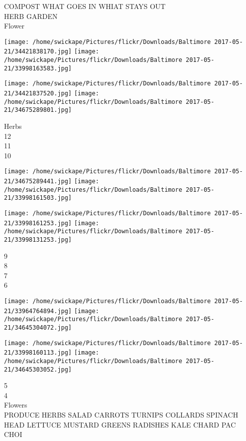 \documentclass[10pt,letterpaper]{article}
\begin{document}
COMPOST WHAT GOES IN WHIAT STAYS OUT\\
HERB GARDEN\\
Flower\\
\pagebreak

\texttt{[image: /home/swickape/Pictures/flickr/Downloads/Baltimore 2017-05-21/34421838170.jpg]}
\texttt{[image: /home/swickape/Pictures/flickr/Downloads/Baltimore 2017-05-21/33998163583.jpg]}

\texttt{[image: /home/swickape/Pictures/flickr/Downloads/Baltimore 2017-05-21/34421837520.jpg]}
\texttt{[image: /home/swickape/Pictures/flickr/Downloads/Baltimore 2017-05-21/34675289801.jpg]}

Herbs\\
12\\
11\\
10\\
\pagebreak

\texttt{[image: /home/swickape/Pictures/flickr/Downloads/Baltimore 2017-05-21/34675289441.jpg]}
\texttt{[image: /home/swickape/Pictures/flickr/Downloads/Baltimore 2017-05-21/33998161503.jpg]}

\texttt{[image: /home/swickape/Pictures/flickr/Downloads/Baltimore 2017-05-21/33998161253.jpg]}
\texttt{[image: /home/swickape/Pictures/flickr/Downloads/Baltimore 2017-05-21/33998131253.jpg]}

9\\
8\\
7\\
6\\
\pagebreak

\texttt{[image: /home/swickape/Pictures/flickr/Downloads/Baltimore 2017-05-21/33964764894.jpg]}
\texttt{[image: /home/swickape/Pictures/flickr/Downloads/Baltimore 2017-05-21/34645304072.jpg]}

\texttt{[image: /home/swickape/Pictures/flickr/Downloads/Baltimore 2017-05-21/33998160113.jpg]}
\texttt{[image: /home/swickape/Pictures/flickr/Downloads/Baltimore 2017-05-21/34645303052.jpg]}

5\\
4\\
Flowers\\
PRODUCE HERBS SALAD CARROTS TURNIPS COLLARDS SPINACH HEAD LETTUCE MUSTARD GREENS RADISHES KALE CHARD PAC CHOI\\
\pagebreak
\end{document}

